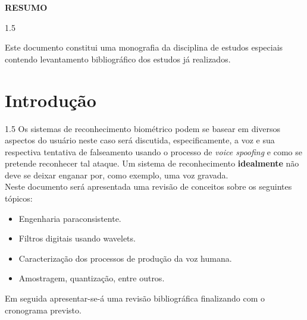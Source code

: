 \documentclass[a4paper,12pt,openright,oneside]{book}
\newenvironment{myenv}[1]
  {\begin{spacing}{#1}}
  {\end{spacing}}
\begin{document}

	\setlength{\parindent}{0pt}
	\newpage \thispagestyle{empty}
	\vspace{1.5cm}
	\fontsize{12}{\baselineskip} \selectfont

	\begin{center}
		{\huge{\textbf{RESUMO}}}
	\end{center}

	\begin{myenv}{1.5}
		\fontsize{12}{\baselineskip} \selectfont \onehalfspacing
		\par \null
		\par \null
		Este documento constitui uma monografia da disciplina de estudos especiais contendo levantamento bibliográfico dos estudos já realizados.
	\end{myenv}

	\cleardoublepage
	\listoffigures
	
	\cleardoublepage
	\listoftables
	\frontmatter
	
	\def\contentsname{Sumário} 
	\tableofcontents
	\cleardoublepage
	
	\mainmatter
	\setlength{\parindent}{1.25cm}

	\chapter{Introdução}
		\begin{myenv}{1.5}
			\setcounter{page}{12}
			Os sistemas de reconhecimento biométrico podem se basear em diversos aspectos do usuário neste caso será discutida, especificamente, a voz e sua respectiva tentativa de falseamento usando o processo de \textit{voice spoofing} e como se pretende reconhecer tal ataque.
			Um sistema de reconhecimento \textbf{idealmente} não deve se deixar enganar por, como exemplo, uma voz gravada.\\
			Neste documento será apresentada uma revisão de conceitos sobre os seguintes tópicos:
			\begin{itemize}
				\item Engenharia paraconsistente.
				\item Filtros digitais usando wavelets.
				\item Caracterização dos processos de produção da voz humana.
				\item Amostragem, quantização, entre outros.
			\end{itemize}
			Em seguida apresentar-se-á uma revisão bibliográfica finalizando com o cronograma previsto.
		\end{myenv}
\end{document}
